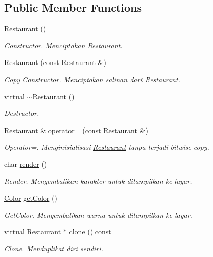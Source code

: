 \subsection*{Public Member Functions}
\begin{DoxyCompactItemize}
\item 
\hyperlink{classRestaurant_af72b2ed0971d325dc5d5dbf91e8462b5}{Restaurant} ()
\begin{DoxyCompactList}\small\item\em Constructor. Menciptakan \hyperlink{classRestaurant}{Restaurant}. \end{DoxyCompactList}\item 
\hyperlink{classRestaurant_adaa766359f8815448607ff3b14ecb4b8}{Restaurant} (const \hyperlink{classRestaurant}{Restaurant} \&)
\begin{DoxyCompactList}\small\item\em Copy Constructor. Menciptakan salinan dari \hyperlink{classRestaurant}{Restaurant}. \end{DoxyCompactList}\item 
virtual \hyperlink{classRestaurant_acb1d786ab04bc4880e79f13d839b9cbc}{$\sim$\+Restaurant} ()
\begin{DoxyCompactList}\small\item\em Destructor. \end{DoxyCompactList}\item 
\hyperlink{classRestaurant}{Restaurant} \& \hyperlink{classRestaurant_a89e8a01e468e5654db9f7b80330d901c}{operator=} (const \hyperlink{classRestaurant}{Restaurant} \&)
\begin{DoxyCompactList}\small\item\em Operator=. Menginisialisasi \hyperlink{classRestaurant}{Restaurant} tanpa terjadi bitwise copy. \end{DoxyCompactList}\item 
char \hyperlink{classRestaurant_aa3c4a7f3b35c0313bdfccd5f222bc51e}{render} ()
\begin{DoxyCompactList}\small\item\em Render. Mengembalikan karakter untuk ditampilkan ke layar. \end{DoxyCompactList}\item 
\hyperlink{color_8h_ab87bacfdad76e61b9412d7124be44c1c}{Color} \hyperlink{classRestaurant_ae8b0ec7efc32d519972c59f6928bb110}{get\+Color} ()
\begin{DoxyCompactList}\small\item\em Get\+Color. Mengembalikan warna untuk ditampilkan ke layar. \end{DoxyCompactList}\item 
virtual \hyperlink{classRestaurant}{Restaurant} $\ast$ \hyperlink{classRestaurant_a8189dd83d787840811b90c2c5dbafda0}{clone} () const 
\begin{DoxyCompactList}\small\item\em Clone. Menduplikat diri sendiri. \end{DoxyCompactList}\end{DoxyCompactItemize}
